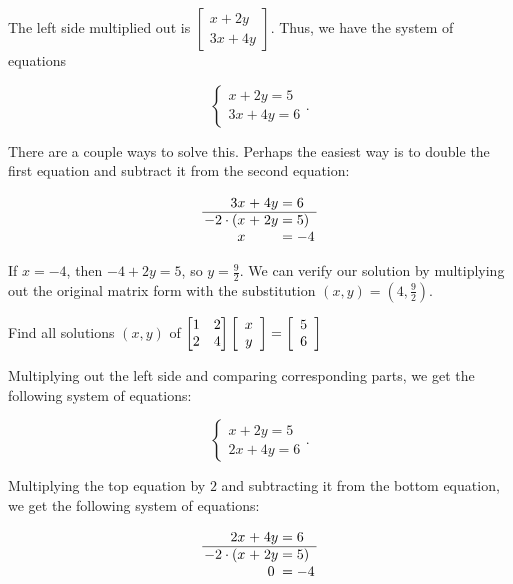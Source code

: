 \documentclass[../gatm_answers.tex]{subfiles}
\begin{document}
The left side multiplied out is $\begin{bmatrix} x+2y \\ 3x+4y \end{bmatrix}$. Thus, we have the system of equations

$$\begin{cases}x+2y=5 \\ 3x+4y=6 \end{cases}.$$

There are a couple ways to solve this. Perhaps the easiest way is to double the first equation and subtract it from the second equation:

$$\arraycolsep=1.4pt\begin{array}{rcccl}
3x & + & 4y & = & 6 \\ \hline
-2\cdot ( x & + & 2y & = & 5) \\
x & & & = & -4 \\
\end{array}$$

If $x=-4$, then $-4+2y=5$, so $y=\frac{9}{2}$. We can verify our solution by multiplying out the original matrix form with the substitution $(x,y)=\left(4,\frac{9}{2}\right)$.

\begin{inner_problem}
\item \label{prob:needed_for_matrix_undo4}Find all solutions $(x,y)$ of $\begin{bmatrix} 1 & 2 \\ 2 & 4 \end{bmatrix}\left[\begin{array}{c} x \\ y \end{array}\right]=\left[\begin{array}{c} 5 \\ 6 \end{array}\right]$
\end{inner_problem}

Multiplying out the left side and comparing corresponding parts, we get the following system of equations:

$$\begin{cases} x + 2y = 5 \\ 2x + 4y = 6 \end{cases}.$$

Multiplying the top equation by $2$ and subtracting it from the bottom equation, we get the following system of equations:

$$\arraycolsep=1.4pt\begin{array}{rcccl}
2x & + & 4y & = & 6 \\ \hline
-2\cdot ( x & + & 2y & = & 5) \\
& & 0 & = & -4 \\
\end{array}$$
\end{document}

